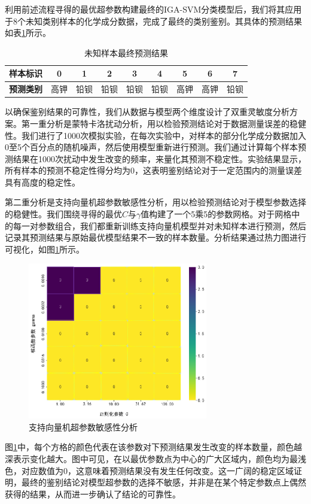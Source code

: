 利用前述流程寻得的最优超参数构建最终的IGA-SVM分类模型后，我们将其应用于8个未知类别样本的化学成分数据，完成了最终的类别鉴别。其具体的预测结果如表\ref{tab:prediction_results}所示。

\begin{table}[H]
    \centering
    \caption{未知样本最终预测结果}
    \label{tab:prediction_results}
    \begin{tabular}{|c|c|c|c|c|c|c|c|c|}
        \hline
        \textbf{样本标识} & 0 & 1 & 2 & 3 & 4 & 5 & 6 & 7 \\
        \hline
        \textbf{预测类别} & 高钾 & 铅钡 & 铅钡 & 铅钡 & 铅钡 & 高钾 & 高钾 & 铅钡 \\
        \hline
    \end{tabular}
\end{table}

以确保鉴别结果的可靠性，我们从数据与模型两个维度设计了双重灵敏度分析方案。第一重分析是蒙特卡洛扰动分析，用以检验预测结论对于数据测量误差的稳健性。我们进行了1000次模拟实验，在每次实验中，对样本的部分化学成分数据加入0至5个百分点的随机噪声，然后使用模型重新进行预测。我们通过计算每个样本预测结果在1000次扰动中发生改变的频率，来量化其预测不稳定性。实验结果显示，所有样本的预测不稳定性得分均为0，这表明鉴别结论对于一定范围内的测量误差具有高度的稳定性。

第二重分析是支持向量机超参数敏感性分析，用以检验预测结论对于模型参数选择的稳健性。我们围绕寻得的最优$C$与$\gamma$值构建了一个5乘5的参数网格。对于网格中的每一对参数组合，我们都重新训练支持向量机模型并对未知样本进行预测，然后记录其预测结果与原始最优模型结果不一致的样本数量。分析结果通过热力图进行可视化，如图\ref{fig:svm_sensitivity}所示。

\begin{figure}[H]
    \centering
    \includegraphics[width=0.7\textwidth]{figs/5问题三/SVM超参数敏感性分析热图.png}
    \caption{支持向量机超参数敏感性分析}
    \label{fig:svm_sensitivity}
\end{figure}

图\ref{fig:svm_sensitivity}中，每个方格的颜色代表在该参数对下预测结果发生改变的样本数量，颜色越深表示变化越大。图中可见，在以最优参数点为中心的广大区域内，颜色均为最浅色，对应数值为0，这意味着预测结果没有发生任何改变。这一广阔的稳定区域证明，最终的鉴别结论对模型超参数的选择不敏感，并非是在某个特定参数点上偶然获得的结果，从而进一步确认了结论的可靠性。
